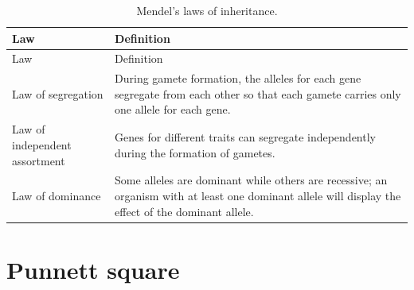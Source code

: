 \documentclass[]{book}
\theoremstyle{definition}
\theoremstyle{definition}
\theoremstyle{definition}
\theoremstyle{remark}
\begin{document}
\begin{longtable}[]{@{}ll@{}}
\caption{\label{tab:mendel} Mendel's laws of inheritance.}\tabularnewline
\toprule
\begin{minipage}[b]{0.05\columnwidth}\raggedright\strut
Law\strut
\end{minipage} & \begin{minipage}[b]{0.14\columnwidth}\raggedright\strut
Definition\strut
\end{minipage}\tabularnewline
\midrule
\endfirsthead
\toprule
\begin{minipage}[b]{0.05\columnwidth}\raggedright\strut
Law\strut
\end{minipage} & \begin{minipage}[b]{0.14\columnwidth}\raggedright\strut
Definition\strut
\end{minipage}\tabularnewline
\midrule
\endhead
\begin{minipage}[t]{0.05\columnwidth}\raggedright\strut
Law of segregation\strut
\end{minipage} & \begin{minipage}[t]{0.14\columnwidth}\raggedright\strut
During gamete formation, the alleles for each gene segregate from each
other so that each gamete carries only one allele for each gene.\strut
\end{minipage}\tabularnewline
\begin{minipage}[t]{0.05\columnwidth}\raggedright\strut
Law of independent assortment\strut
\end{minipage} & \begin{minipage}[t]{0.14\columnwidth}\raggedright\strut
Genes for different traits can segregate independently during the
formation of gametes.\strut
\end{minipage}\tabularnewline
\begin{minipage}[t]{0.05\columnwidth}\raggedright\strut
Law of dominance\strut
\end{minipage} & \begin{minipage}[t]{0.14\columnwidth}\raggedright\strut
Some alleles are dominant while others are recessive; an organism with
at least one dominant allele will display the effect of the dominant
allele.\strut
\end{minipage}\tabularnewline
\bottomrule
\end{longtable}

\section{Punnett square}\label{punnett-square}
\end{document}
